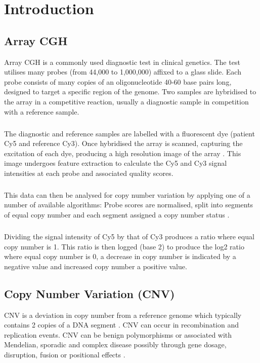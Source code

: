 
\chapter{Introduction}\label{ch:introduction}

\section{Array CGH}
Array \ac{CGH} is a commonly used diagnostic test in clinical genetics. The test utilises many probes (from 44,000 to 1,000,000) affixed to a glass slide. 
Each probe consists of many copies of an oligonucleotide 40-60 base pairs long, designed to target a specific region of the genome. Two samples are hybridised to the array in a competitive reaction, usually a diagnostic sample in competition with a reference sample. 
\paragraph*{}
The diagnostic and reference samples are labelled with a fluorescent dye (patient \ac{Cy5} and reference \ac{Cy3}). Once hybridised the array is scanned, capturing the excitation of each dye, producing a high resolution image of the array \cite{ahn2010}. This image undergoes feature extraction to calculate the Cy5 and Cy3 signal intensities at each probe and associated quality scores.
\paragraph*{}
This data can then be analysed for copy number variation by applying one of a number of available algorithms: Probe scores are normalised, split into segments of equal copy number and each segment assigned a copy number status \cite{hupe2004}.
\paragraph*{}
Dividing the signal intensity of Cy5 by that of Cy3 produces a ratio where equal copy number is 1. This ratio is then logged (base 2) to produce the log2 ratio where equal copy number is 0, a decrease in copy number is indicated by a negative value and increased copy number a positive  value. 
\section{Copy Number Variation (CNV)}
\ac{CNV} is a deviation in copy number from a reference genome which typically contains 2 copies of a DNA segment \cite{roy2013}. CNV can occur in recombination and replication events. CNV can be benign polymorphisms or associated with Mendelian, sporadic and complex disease possibly through gene dosage, disruption, fusion or positional effects \cite{zhang2009}.

